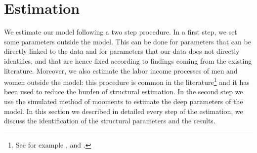 \documentclass[12pt]{article}
\numberwithin{table}{section}
\begin{document}
\section{Estimation}
We estimate our model following a two step procedure. In a first step, we set some parameters outside the model. This can be done for parameters that can be directly linked to the data and for parameters that our data does not directly identifies, and that are hence fixed according to findings coming from the existing literature. Moreover, we also estimate the labor income processes of men and women outside the model: this procedure is common in the literature\footnote{See for example \cite{voena2015}, \cite{reynoso2019} and \cite{gourinchas2002}.} and it has been used to reduce the burden of structural estimation.
 In the second step we use the simulated method of mooments to estimate the deep parameters of the model. In this section we described in detailed every step of the estimation, we discuss the identification of the structural parameters and the results.
\end{document}
